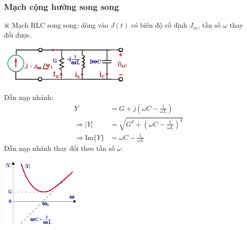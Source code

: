 \subsubsection{Mạch cộng hưởng song song}
$\divideontimes$ Mạch RLC song song: dòng vào $J(t)$ có biên độ cố định $J_m$, tần số $\omega$ thay đổi được.
\begin{center}
    \includegraphics[width = 0.5\textwidth]{./image/71.png}
\end{center}
Dẫn nạp nhánh:
\begin{equation}
    \begin{aligned}
        Y &= G + j\left(\omega C - \frac{1}{\omega L}\right) \\
        \Rightarrow |Y| &= \sqrt{G^2 + \left(\omega C - \frac{1}{\omega L}\right)^2} \\
        \Rightarrow \text{Im} \lbrace Y \rbrace &= \omega C - \frac{1}{\omega L}
    \end{aligned}
\end{equation}
Dẫn nạp nhánh thay đổi theo tần số $\omega$.
\begin{center}
    \includegraphics[width = 0.3\textwidth]{./image/72.png}
\end{center}

